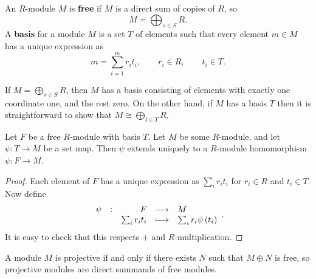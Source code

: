 \begin{definition}
An $ R $-module $ M $ is \textbf{free} if $ M $ is a direct sum of copies of $ R $, so
$$ M = \bigoplus_{s \in S} R. $$
A \textbf{basis} for a module $ M $ is a set $ T $ of elements such that every element $ m \in M $ has a unique expression as
$$ m = \sum_{i = 1}^m r_it_i, \qquad r_i \in R, \qquad t_i \in T. $$
\end{definition}

If $ M = \bigoplus_{s \in S} R $, then $ M $ has a basis consisting of elements with exactly one coordinate one, and the rest zero. On the other hand, if $ M $ has a basis $ T $ then it is straightforward to show that $ M \cong \bigoplus_{t \in T} R $.

\begin{proposition}
Let $ F $ be a free $ R $-module with basis $ T $. Let $ M $ be some $ R $-module, and let $ \psi : T \to M $ be a set map. Then $ \psi $ extends uniquely to a $ R $-module homomorphism $ \psi : F \to M $.
\end{proposition}

\begin{proof}
Each element of $ F $ has a unique expression as $ \sum_i r_it_i $ for $ r_i \in R $ and $ t_i \in T $. Now define
$$ \function[\psi]{F}{M}{\sum_i r_it_i}{\sum_i r_i\psi\br{t_i}}. $$
It is easy to check that this respects $ + $ and $ R $-multiplication.
\end{proof}

\begin{proposition}
A module $ M $ is projective if and only if there exists $ N $ such that $ M \oplus N $ is free, so projective modules are direct summands of free modules.
\end{proposition}

